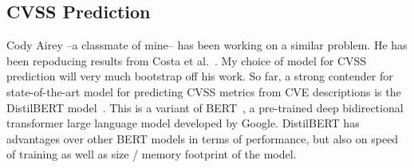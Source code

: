 \documentclass[12pt]{article}
\begin{document}




\subsection{CVSS Prediction} \label{cvss_prediction}

Cody Airey --a classmate of mine-- has been working on a similar problem. He has been repoducing
results from Costa et al.\@~\cite{costa}. My choice of model for CVSS prediction will very much
bootstrap off his work. So far, a strong contender for state-of-the-art model for predicting CVSS
metrics from CVE descriptions is the DistilBERT model~\cite{distilbert}. This is a variant of
BERT~\cite{BERT}, a pre-trained deep bidirectional transformer large language model developed by
Google. DistilBERT has advantages over other BERT models in terms of performance, but also on speed
of training as well as size / memory footprint of the model.
\end{document}
